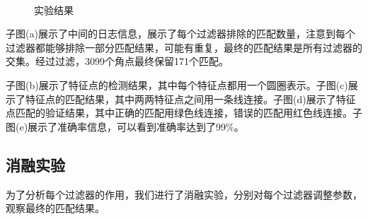 \begin{figure}[H]
{    }
    \\
    \caption{实验结果}
    \label{fig:results}
\end{figure}

子图(a)展示了中间的日志信息，展示了每个过滤器排除的匹配数量，注意到每个过滤器都能够排除一部分匹配结果，可能有重复，最终的匹配结果是所有过滤器的交集。经过过滤，3099个角点最终保留171个匹配。

子图(b)展示了特征点的检测结果，其中每个特征点都用一个圆圈表示。子图(c)展示了特征点的匹配结果，其中两两特征点之间用一条线连接。子图(d)展示了特征点匹配的验证结果，其中正确的匹配用绿色线连接，错误的匹配用红色线连接。子图(e)展示了准确率信息，可以看到准确率达到了99\%。

\subsection{消融实验}

为了分析每个过滤器的作用，我们进行了消融实验，分别对每个过滤器调整参数，观察最终的匹配结果。

